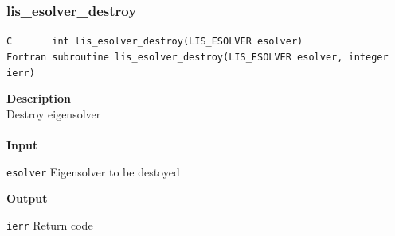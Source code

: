 \documentclass[a4paper]{article}
\newcommand{\namelistlabel}[1]{\mbox{#1}\hfill}
\newenvironment{namelist}[1]{%
 \begin{list}{}
  {\let\makelabel\namelistlabel
  \settowidth{\labelwidth}{#1}
  \setlength{\leftmargin}{1.1\labelwidth}}
}{%
\end{list}}
\begin{document}
  \subsubsection{lis\_esolver\_destroy}
\begin{screen}
\verb|C       int lis_esolver_destroy(LIS_ESOLVER esolver)|\\
\verb|Fortran subroutine lis_esolver_destroy(LIS_ESOLVER esolver, integer ierr)|
\end{screen}
{\bf Description}\\
\indent
Destroy eigensolver
\\ \\
\noindent
{\bf Input}
\begin{namelist}{XXXXXXXXXXXXXXXXXXXX}
\item[\tt esolver] Eigensolver to be destoyed
\end{namelist}
{\bf Output}
\begin{namelist}{XXXXXXXXXXXXXXXXXXXX}
\item[\tt ierr] Return code
\end{namelist}
\newpage
\end{document}
